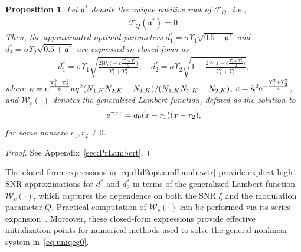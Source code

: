 \documentclass[journal,12pt,onecolumn,draftclsnofoot]{IEEEtran}
\newtheorem{prop}{Proposition}
\theoremstyle{definition}
\begin{document}
\begin{prop}\label{Pr:Lambert}
     Let  $\mathfrak{a}^*$ denote the unique positive root of $ \mathcal{F}_Q$, i.e., 
    \begin{align}
       \label{eq:tildgforlambert}
      \mathcal{F}_Q(\mathfrak{a}^*)=0.  
    \end{align}
    Then, the approximated optimal parameters ${d}_1^* = \sigma\Upsilon_1 \sqrt{0.5 - \mathfrak{a}^*}$ and $ {d}_2^* =\sigma \Upsilon_2 \sqrt{0.5 + \mathfrak{a}^*}$  are expressed in closed form as
     \begin{subequations}
        \label{eq:d1d2optiamlLambewtr}
    \begin{align}
      d_1^*  = \sigma \Upsilon_1\sqrt{  \frac{2\mathcal{W}_{c}\Big(-c \frac{\Upsilon_1^2+\Upsilon_2^2}{2} \Big)}{\Upsilon_1^2+\Upsilon_2^2}    }, \quad  d_2^* = \sigma\Upsilon_2\sqrt{1-  \frac{2\mathcal{W}_{c}\Big(-c \frac{\Upsilon_1^2+\Upsilon_2^2}{2} \Big)}{\Upsilon_1^2+\Upsilon_2^2}   },
    \end{align}
     \end{subequations}
    where  $\tilde{\kappa} = {\rm e}^{\frac{\Upsilon_1^2-\Upsilon_2^2}{8}}\kappa q^2 (N_{1, K}N_{2 ,K}-N_{1 ,K})/(N_{1 ,K}N_{ 2,K}-N_{2 ,K})$, $c =  \tilde{\kappa}^2 {\rm e}^{-\frac{\Upsilon_1^2+\Upsilon_2^2}{4}}$,  and $\mathcal{W}_c(\cdot)$ denotes the generalized Lambert function, defined as the solution to
    \begin{align}
        {\rm e}^{-cx} = a_0(x-r_1)(x-r_2),
    \end{align}
     for some nonzero $r_1,r_2\neq 0$.
\end{prop}
\begin{proof}
    See Appendix~\ref{sec:PrLambert}. 
\end{proof}

The closed-form expressions in \eqref{eq:d1d2optiamlLambewtr} provide explicit high-SNR approximations for $d_1^*$ and $d_2^*$ in terms of the generalized Lambert function $\mathcal{W}_c(\cdot)$, which captures the dependence on both the SNR $\xi$ and the modulation parameter $Q$.  Practical computation of $\mathcal{W}_c(\cdot)$ can be performed via its series expansion~\cite{scott2014asymptotic,mezHo2017generalization}. 
Moreover, these closed-form expressions provide effective initialization points for numerical methods used to solve the general nonlinear system in~\eqref{eq:uniqeg0}.
\end{document}
